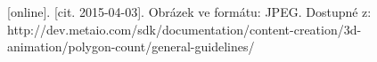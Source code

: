 \documentclass[twoside,12pt]{article}
\begin{document}
\begin{literatura}
{
	[online]. [cit. 2015-04-03]. 
	Obrázek ve formátu: JPEG. Dostupné z: http://dev.metaio.com/sdk/documentation/content-creation/3d-animation/polygon-count/general-guidelines/
}





%




\end{literatura}
\end{document}
